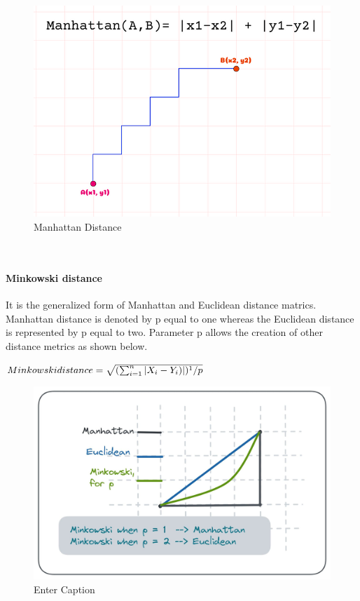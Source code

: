 \documentclass[conference]{IEEEtran}
\begin{document}
\begin{figure}
    \centering
    \includegraphics[width=0.8\linewidth]{a.png}
    \caption{Manhattan Distance}
    \label{fig:enter-label}
\end{figure}

\

\paragraph{\textbf{Minkowski distance}}
It is the generalized form of Manhattan and Euclidean distance matrics. Manhattan distance is denoted by p equal to one whereas the Euclidean distance is represented by p equal to two. Parameter p allows the creation of other distance metrics as shown below.

\begin{math}
 Minkowski distance =\sqrt{(\sum_{i=1}^{n} |X_{i} - Y_{i})|)^1/p}
 \newline
\end{math}

\begin{figure}
    \centering
    \includegraphics[width=0.8\linewidth]{b.jpg}
    \caption{Enter Caption}
    \label{fig:enter-label}
\end{figure}
\end{document}
